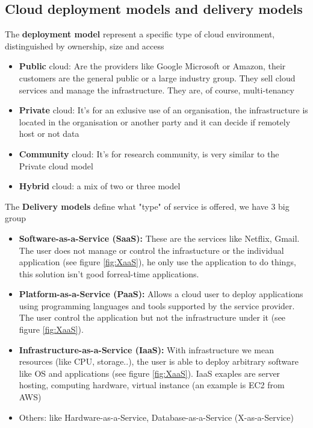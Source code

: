 \subsection{Cloud deployment models and delivery models}
The \textbf{deployment model} represent a specific type of cloud environment, distinguished by ownership, size and access
\begin{itemize}
    \item \textbf{Public} cloud: Are the providers like Google Microsoft or Amazon, their customers are the general public or a large industry group. They sell cloud services and manage the infrastructure. They are, of course, multi-tenancy
    \item \textbf{Private} cloud: It's for an exlusive use of an organisation, the infrastructure is located in the organisation or another party and it can decide if remotely host or not data
    \item \textbf{Community} cloud: It's for research community, is very similar to the Private cloud model
    \item \textbf{Hybrid} cloud: a mix of two or three model
\end{itemize}
The \textbf{Delivery models} define what "type" of service is offered, we have 3 big group
\begin{itemize}
    \item \textbf{Software-as-a-Service (SaaS):} These are the services like Netflix, Gmail. The user does not manage or control the infrastucture or the individual application (see figure \ref{fig:XaaS}), he only use the application to do things, this solution isn't good forreal-time applications.
    \item \textbf{Platform-as-a-Service (PaaS):} Allows a cloud user to deploy applications using programming languages and tools supported by the service provider. The user control the application but not the infrastructure under it (see figure \ref{fig:XaaS}).
    \item \textbf{Infrastructure-as-a-Service (IaaS):} With infrastructure we mean resources (like CPU, storage..), the user is able to deploy arbitrary software like OS and applications (see figure \ref{fig:XaaS}). IaaS exaples are server hosting, computing hardware, virtual instance (an example is EC2 from AWS)
    \item Others: like Hardware-as-a-Service, Database-as-a-Service (X-as-a-Service)
\end{itemize}
